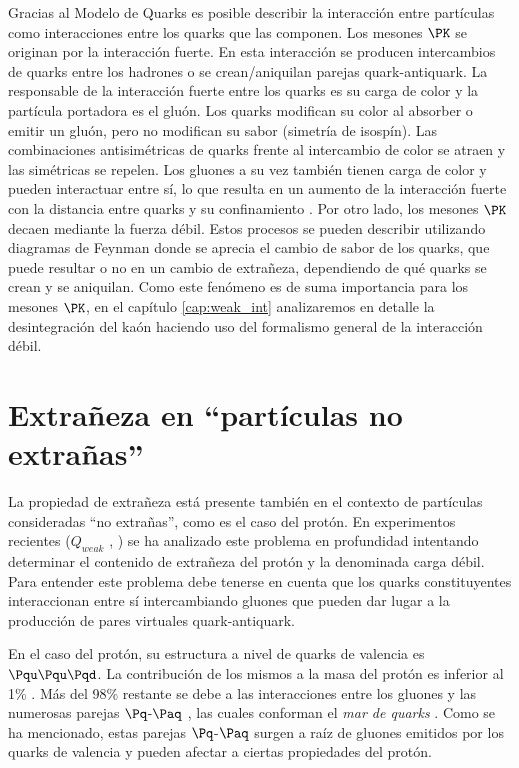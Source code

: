 Gracias al Modelo de Quarks es posible describir la interacción entre partículas como interacciones entre los quarks que las componen. Los mesones $\PK$ se originan por la interacción fuerte. En esta interacción se producen intercambios de quarks entre los hadrones o se crean/aniquilan parejas quark-antiquark. La responsable de la interacción fuerte entre los quarks es su carga de color y la partícula portadora es el gluón.  Los quarks modifican su color al absorber o emitir un gluón, pero no modifican su sabor (simetría de isospín). Las combinaciones antisimétricas de quarks frente al intercambio de color se atraen y las simétricas se repelen. Los gluones a su vez también tienen carga de color y pueden interactuar entre sí, lo que resulta en un aumento de la interacción fuerte con la distancia entre quarks y su confinamiento \cite{notas2020}. Por otro lado, los mesones $\PK$ decaen mediante la fuerza débil. Estos procesos se pueden describir utilizando diagramas de Feynman donde se aprecia el cambio de sabor de los quarks, que puede resultar o no en un cambio de extrañeza, dependiendo de qué quarks se crean y se aniquilan. Como este fenómeno es de suma importancia para los mesones $\PK$, en el capítulo \ref{cap:weak_int} analizaremos en detalle la desintegración del kaón haciendo uso del formalismo general de la interacción débil.\\

\section{Extrañeza en ``partículas no extrañas''}
\label{cap:non-strange_particles}
La propiedad de extrañeza está presente también en el contexto de partículas consideradas ``no extrañas'', como es el caso del protón. En experimentos recientes ($Q_{weak}$ \cite{nuruzzaman}, \cite{carlini}) se ha analizado este problema en profundidad intentando determinar el contenido de extrañeza del protón y la denominada carga débil. Para entender este problema debe tenerse en cuenta que los quarks constituyentes interaccionan entre sí intercambiando gluones que pueden dar lugar a la producción de pares virtuales quark-antiquark.

En el caso del protón, su estructura a nivel de quarks de valencia es $\Pqu\Pqu\Pqd$. La contribución de los mismos a la masa del protón es inferior al 1\% \cite{Roberts}. Más del 98\% restante se debe a las interacciones entre los gluones y las numerosas parejas $\Pq$-$\Paq$ \cite{Walker}, las cuales conforman el \textit{mar de quarks} \cite{Halzen}. Como se ha mencionado, estas parejas $\Pq$-$\Paq$ surgen a raíz de gluones emitidos por los quarks de valencia \cite{Donelly} y pueden afectar a ciertas propiedades del protón. 

